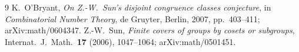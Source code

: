 \documentclass[11pt]{article}
\theoremstyle{remark}
\theoremstyle{definition}
\begin{document}
\begin{thebibliography}{9}
 K.~O'Bryant, \emph{On Z.-W.\ Sun's disjoint congruence classes conjecture}, in
  \emph{Combinatorial Number Theory}, de Gruyter, Berlin, 2007, pp.~403--411; arXiv:math/0604347.
 Z.-W.~Sun, \emph{Finite covers of groups by cosets or subgroups}, Internat.\ J.\ Math.\
  \textbf{17} (2006), 1047--1064; arXiv:math/0501451.
\end{thebibliography}
\end{document}
